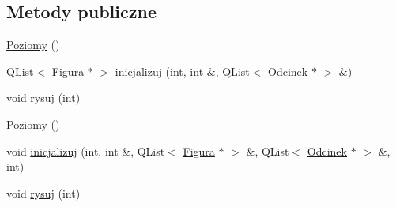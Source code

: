 \subsection*{Metody publiczne}
\begin{DoxyCompactItemize}
\item 
\hyperlink{classPoziomy_abc97f7b56776be4aaa849fd17dde4317}{Poziomy} ()
\item 
Q\-List$<$ \hyperlink{classFigura}{Figura} $\ast$ $>$ \hyperlink{classPoziomy_a32f07203b1e6bd915eb2306c74b0f300}{inicjalizuj} (int, int \&, Q\-List$<$ \hyperlink{classOdcinek}{Odcinek} $\ast$ $>$ \&)
\item 
void \hyperlink{classPoziomy_a8efa5a40aaef0d86dc136d3a712f25e8}{rysuj} (int)
\item 
\hyperlink{classPoziomy_abc97f7b56776be4aaa849fd17dde4317}{Poziomy} ()
\item 
void \hyperlink{classPoziomy_a13f3126aa0067f36339326ee1382f33a}{inicjalizuj} (int, int \&, Q\-List$<$ \hyperlink{classFigura}{Figura} $\ast$ $>$ \&, Q\-List$<$ \hyperlink{classOdcinek}{Odcinek} $\ast$ $>$ \&, int)
\item 
void \hyperlink{classPoziomy_a8efa5a40aaef0d86dc136d3a712f25e8}{rysuj} (int)
\end{DoxyCompactItemize}


